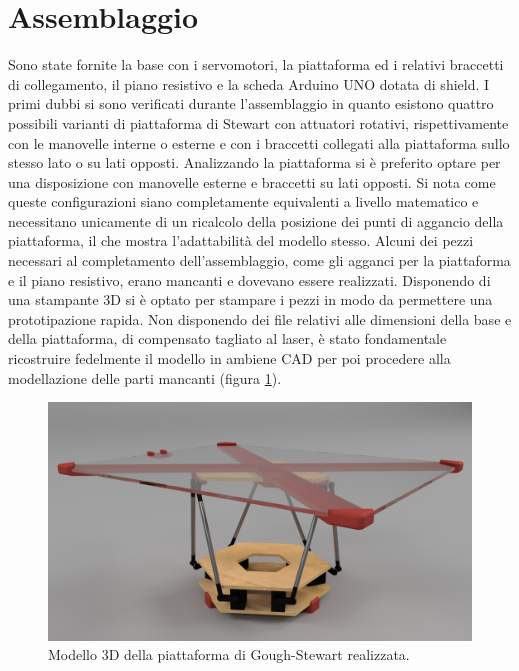 \documentclass[12pt,twoside,openright]{report}
\begin{document}
\section{Assemblaggio}\label{assemblaggio}
Sono state fornite la base con i servomotori, la piattaforma ed i relativi braccetti di collegamento, il piano resistivo e la scheda Arduino UNO dotata di shield. I primi dubbi si sono verificati durante l'assemblaggio in quanto esistono quattro possibili varianti di piattaforma di Stewart con attuatori rotativi, rispettivamente con le manovelle interne o esterne e con i braccetti collegati alla piattaforma sullo stesso lato o su lati opposti. Analizzando la piattaforma si è preferito optare per una disposizione con manovelle esterne e braccetti su lati opposti. Si nota come queste configurazioni siano completamente equivalenti a livello matematico e necessitano unicamente di un ricalcolo della posizione dei punti di aggancio della piattaforma, il che mostra l'adattabilità del modello stesso. Alcuni dei pezzi necessari al completamento dell'assemblaggio, come gli agganci per la piattaforma e il piano resistivo, erano mancanti e dovevano essere realizzati. Disponendo di una stampante 3D si è optato per stampare i pezzi in modo da permettere una prototipazione rapida. Non disponendo dei file relativi alle dimensioni della base e della piattaforma, di compensato tagliato al laser, è stato fondamentale ricostruire fedelmente il modello in ambiene CAD per poi procedere alla modellazione delle parti mancanti (figura \ref{fig:renderstewart}). 
\begin{figure}[h!]
\centering
\includegraphics[width=\textwidth]{stewart.png}
\caption{Modello 3D della piattaforma di Gough-Stewart realizzata.} \label{fig:renderstewart}
\end{figure}
\end{document}
